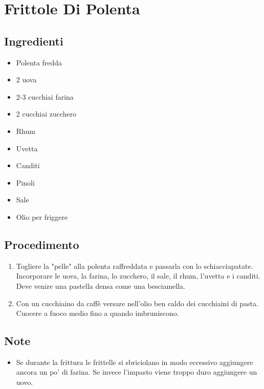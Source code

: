 \section{Frittole Di Polenta}
\subsection{Ingredienti}
\begin{itemize}
\item Polenta fredda   
\item 2 uova  
\item 2-3 cucchiai farina  
\item 2 cucchiai zucchero  
\item Rhum  
\item Uvetta  
\item Canditi  
\item Pinoli  
\item Sale  
\item Olio per friggere
\end{itemize}
\subsection{Procedimento}
\begin{enumerate}
\item  Togliere la "pelle" alla polenta raffreddata e passarla con lo schiacciapatate. Incorporare le uova, la farina, lo zucchero, il sale, il rhum, l'uvetta e i canditi. Deve venire una pastella densa come una besciamella.   
\item  Con un cucchiaino da caffè versare nell'olio ben caldo dei cucchiaini di pasta. Cuocere a fuoco medio fino a quando imbruniscono.
\end{enumerate}
\subsection{Note}
\begin{itemize}
\item Se durante la frittura le frittelle si sbriciolano in modo eccessivo aggiungere ancora un po' di farina. Se invece l'impasto viene troppo duro aggiungere un uovo.
\end{itemize}
